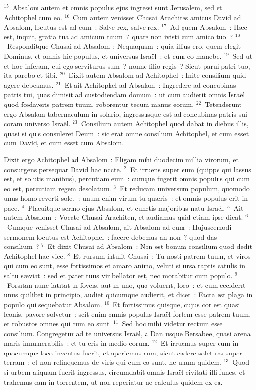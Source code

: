 ${}^{15}$~Absalom autem et omnis populus ejus ingressi sunt Jerusalem, sed et Achitophel cum eo.
${}^{16}$~Cum autem venisset Chusai Arachites amicus David ad Absalom, locutus est ad eum~: Salve rex, salve rex.
${}^{17}$~Ad quem Absalom~: H\ae c est, inquit, gratia tua ad amicum tuum~? quare non ivisti cum amico tuo~?
${}^{18}$~Responditque Chusai ad Absalom~: Nequaquam~: quia illius ero, quem elegit Dominus, et omnis hic populus, et universus Isra\"el~: et cum eo manebo.
${}^{19}$~Sed ut et hoc inferam, cui ego serviturus sum~? nonne filio regis~? Sicut parui patri tuo, ita parebo et tibi.
${}^{20}$~Dixit autem Absalom ad Achitophel~: Inite consilium quid agere debeamus.
${}^{21}$~Et ait Achitophel ad Absalom~: Ingredere ad concubinas patris tui, quas dimisit ad custodiendam domum~: ut cum audierit omnis Isra\"el quod fœdaveris patrem tuum, roborentur tecum manus eorum.
${}^{22}$~Tetenderunt ergo Absalom tabernaculum in solario, ingressusque est ad concubinas patris sui coram universo Isra\"el.
${}^{23}$~Consilium autem Achitophel quod dabat in diebus illis, quasi si quis consuleret Deum~: sic erat omne consilium Achitophel, et cum esset cum David, et cum esset cum Absalom.

\lettrine[lines=3,image=true,loversize=0.05,lraise=-0.03]{D}{}ixit ergo Achitophel ad Absalom~: Eligam mihi duodecim millia virorum, et consurgens persequar David hac nocte.
${}^{2}$~Et irruens super eum (quippe qui lassus est, et solutis manibus), percutiam eum~: cumque fugerit omnis populus qui cum eo est, percutiam regem desolatum.
${}^{3}$~Et reducam universum populum, quomodo unus homo reverti solet~: unum enim virum tu qu\ae ris~: et omnis populus erit in pace.
${}^{4}$~Placuitque sermo ejus Absalom, et cunctis majoribus natu Isra\"el.
${}^{5}$~Ait autem Absalom~: Vocate Chusai Arachiten, et audiamus quid etiam ipse dicat.
${}^{6}$~Cumque venisset Chusai ad Absalom, ait Absalom ad eum~: Hujuscemodi sermonem locutus est Achitophel~: facere debemus an non~? quod das consilium~?
${}^{7}$~Et dixit Chusai ad Absalom~: Non est bonum consilium quod dedit Achitophel hac vice.
${}^{8}$~Et rursum intulit Chusai~: Tu nosti patrem tuum, et viros qui cum eo sunt, esse fortissimos et amaro animo, veluti si ursa raptis catulis in saltu s\ae viat~: sed et pater tuus vir bellator est, nec morabitur cum populo.
${}^{9}$~Forsitan nunc latitat in foveis, aut in uno, quo voluerit, loco~: et cum ceciderit unus quilibet in principio, audiet quicumque audierit, et dicet~: Facta est plaga in populo qui sequebatur Absalom.
${}^{10}$~Et fortissimus quisque, cujus cor est quasi leonis, pavore solvetur~: scit enim omnis populus Isra\"el fortem esse patrem tuum, et robustos omnes qui cum eo sunt.
${}^{11}$~Sed hoc mihi videtur rectum esse consilium. Congregetur ad te universus Isra\"el, a Dan usque Bersabee, quasi arena maris innumerabilis~: et tu eris in medio eorum.
${}^{12}$~Et irruemus super eum in quocumque loco inventus fuerit, et operiemus eum, sicut cadere solet ros super terram~: et non relinquemus de viris qui cum eo sunt, ne unum quidem.
${}^{13}$~Quod si urbem aliquam fuerit ingressus, circumdabit omnis Isra\"el civitati illi funes, et trahemus eam in torrentem, ut non reperiatur ne calculus quidem ex ea.


